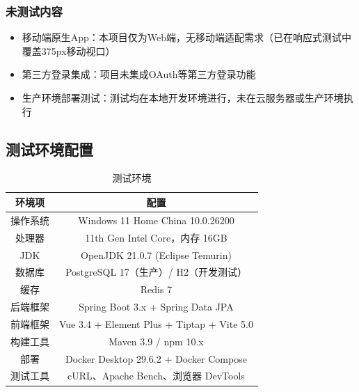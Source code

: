 \documentclass{../softeng}
\begin{document}
\subsubsection{未测试内容}
\begin{itemize}
    \item 移动端原生App：本项目仅为Web端，无移动端适配需求（已在响应式测试中覆盖375px移动视口）
    \item 第三方登录集成：项目未集成OAuth等第三方登录功能
    \item 生产环境部署测试：测试均在本地开发环境进行，未在云服务器或生产环境执行
\end{itemize}

\subsection{测试环境配置}

\begin{table}[htbp]
    \centering
    \caption{测试环境}
    \begin{tabular}{|c|c|}
        \hline
        \textbf{环境项} & \textbf{配置} \\
        \hline
        操作系统 & Windows 11 Home China 10.0.26200 \\
        \hline
        处理器 & 11th Gen Intel Core，内存 16GB \\
        \hline
        JDK & OpenJDK 21.0.7 (Eclipse Temurin) \\
        \hline
        数据库 & PostgreSQL 17（生产）/ H2（开发测试） \\
        \hline
        缓存 & Redis 7 \\
        \hline
        后端框架 & Spring Boot 3.x + Spring Data JPA \\
        \hline
        前端框架 & Vue 3.4 + Element Plus + Tiptap + Vite 5.0 \\
        \hline
        构建工具 & Maven 3.9 / npm 10.x \\
        \hline
        部署 & Docker Desktop 29.6.2 + Docker Compose \\
        \hline
        测试工具 & cURL、Apache Bench、浏览器 DevTools \\
        \hline
    \end{tabular}
\end{table}










\end{document}
